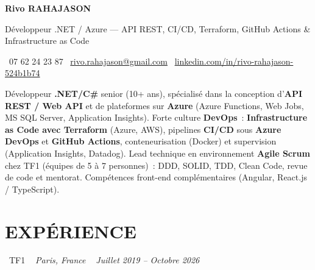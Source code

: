 \documentclass[10pt,a4paper]{article}
\begin{document}
\begin{center}
{\Huge \textbf{\color{ink}Rivo RAHAJASON}}

\vspace{4pt}

{\large \color{primary} Développeur .NET / Azure --- API REST, CI/CD, Terraform, GitHub Actions \& Infrastructure as Code}

\vspace{6pt}

\color{darkgray} \faPhone\  07 62 24 23 87 \quad
\color{darkgray} \faEnvelope\ \href{mailto:rivo.rahajason@gmail.com}{rivo.rahajason@gmail.com} \quad
\color{darkgray} \faLinkedin\ \href{https://linkedin.com/in/rivo-rahajason-524b1b74}{linkedin.com/in/rivo-rahajason-524b1b74}

\vspace{10pt}

\begin{minipage}{\textwidth}
\small\color{darkgray}
Développeur \textbf{.NET/C\#} senior (10+ ans), spécialisé dans la conception d'\textbf{API REST / Web API} et de plateformes sur \textbf{Azure} (Azure Functions, Web Jobs, MS SQL Server, Application Insights). Forte culture \textbf{DevOps}~: \textbf{Infrastructure as Code avec Terraform} (Azure, AWS), pipelines \textbf{CI/CD} sous \textbf{Azure DevOps} et \textbf{GitHub Actions}, conteneurisation (Docker) et supervision (Application Insights, Datadog). Lead technique en environnement \textbf{Agile Scrum} chez TF1 (équipes de 5 à 7 personnes)~: DDD, SOLID, TDD, Clean Code, revue de code et mentorat. Compétences front-end complémentaires (Angular, React.js / TypeScript).
\end{minipage}

\vspace{16pt}
\end{center}

\section*{EXPÉRIENCE}

\noindent\textcolor{primary}{ \faBuilding\ TF1} \quad
\textit{ \small \textcolor{darkgray}{ \faMapMarker\ } Paris, France } \hfill
\textit{ \small \textcolor{darkgray}{ \faCalendar\ } Juillet 2019 -- Octobre 2026 }

\vspace{4pt}
\end{document}
